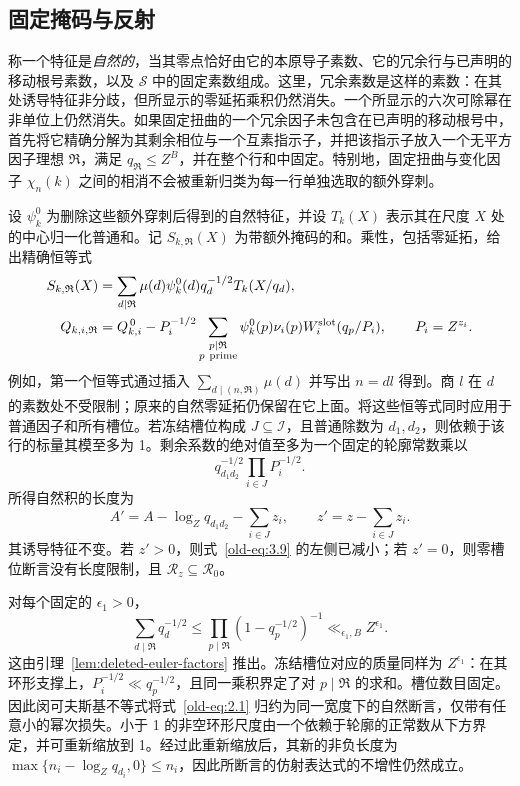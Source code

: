 \documentclass[11pt,a4paper]{article}
\numberwithin{equation}{section}
\numberwithin{figure}{section}
\theoremstyle{definition}
\theoremstyle{remark}
\begin{document}
\subsection{固定掩码与反射}

称一个特征是\emph{自然的}，当其零点恰好由它的本原导子素数、它的冗余行与已声明的移动根号素数，以及 \(\mathcal S\) 中的固定素数组成。这里，冗余素数是这样的素数：在其处诱导特征非分歧，但所显示的零延拓乘积仍然消失。一个所显示的六次可除幂在非单位上仍然消失。如果固定扭曲的一个冗余因子未包含在已声明的移动根号中，首先将它精确分解为其剩余相位与一个互素指示子，并把该指示子放入一个无平方因子理想 \(\mathfrak R\)，满足 \(q_{\mathfrak R}\le Z^B\)，并在整个行和中固定。特别地，固定扭曲与变化因子 \(\chi_n(k)\) 之间的相消不会被重新归类为每一行单独选取的额外穿刺。

设 \(\psi_k^0\) 为删除这些额外穿刺后得到的自然特征，并设 \(T_k(X)\) 表示其在尺度 \(X\) 处的中心归一化普通和。记 \(S_{k,\mathfrak R}(X)\) 为带额外掩码的和。乘性，包括零延拓，给出精确恒等式
\begin{align}
 S_{k,\mathfrak R}(X)
 &=\sum_{d\mid\mathfrak R}\mu(d)\psi_k^0(d)q_d^{-1/2}
                  T_k(X/q_d),
 \label{old-eq:2.1a}\\
 Q_{k,i,\mathfrak R}
 &=Q_{k,i}^{\,0}
   -P_i^{-1/2}\sum_{\substack{p\mid\mathfrak R\\p\ {\rm prime}}}
       \psi_k^0(p)\nu_i(p)W_i^{\rm slot}(q_p/P_i),
 \qquad P_i=Z^{z_i}.
 \label{eq:prime-mask-erasure}
\end{align}
例如，第一个恒等式通过插入 \(\sum_{d\mid(n,\mathfrak R)}\mu(d)\) 并写出 \(n=dl\) 得到。商 \(l\) 在 \(d\) 的素数处不受限制；原来的自然零延拓仍保留在它上面。将这些恒等式同时应用于普通因子和所有槽位。若冻结槽位构成 \(J\subseteq\mathcal I\)，且普通除数为 \(d_1,d_2\)，则依赖于该行的标量其模至多为 1。剩余系数的绝对值至多为一个固定的轮廓常数乘以
\[
 q_{d_1d_2}^{-1/2}\prod_{i\in J}P_i^{-1/2}.
\]
所得自然积的长度为
\[
 A'=A-\log_Zq_{d_1d_2}-\sum_{i\in J}z_i,\qquad
 z'=z-\sum_{i\in J}z_i.
\]
其诱导特征不变。若 \(z'>0\)，则式~\eqref{old-eq:3.9} 的左侧已减小；若 \(z'=0\)，则零槽位断言没有长度限制，且
\(\mathcal R_z\subseteq\mathcal R_0\)。

对每个固定的 \(\epsilon_1>0\)，
\begin{equation}
 \sum_{d\mid\mathfrak R}q_d^{-1/2}
 \le \prod_{p\mid\mathfrak R}(1-q_p^{-1/2})^{-1}
 \ll_{\epsilon_1,B} Z^{\epsilon_1}.
 \label{old-eq:2.1b}
\end{equation}
这由引理~\ref{lem:deleted-euler-factors} 推出。冻结槽位对应的质量同样为 \(Z^{\epsilon_1}\)：在其环形支撑上，\(P_i^{-1/2}\ll q_p^{-1/2}\)，且同一乘积界定了对 \(p\mid\mathfrak R\) 的求和。槽位数目固定。因此闵可夫斯基不等式将式~\eqref{old-eq:2.1} 归约为同一宽度下的自然断言，仅带有任意小的幂次损失。小于 1 的非空环形尺度由一个依赖于轮廓的正常数从下方界定，并可重新缩放到 1。经过此重新缩放后，其新的非负长度为
\(\max\{n_i-\log_Zq_{d_i},0\}\le n_i\)，因此所断言的仿射表达式的不增性仍然成立。
\end{document}
